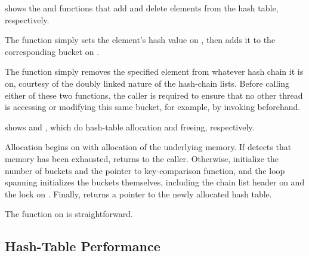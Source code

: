 shows the  and  functions
that add and delete elements from the hash table, respectively.

\begin{fcvref}
The  function simply sets the element's hash
value on , then adds it to the corresponding bucket on
.
\end{fcvref}
The  function simply removes the specified element
from whatever hash chain it is on, courtesy of the doubly linked
nature of the hash-chain lists.
Before calling either of these two functions, the caller is required to
ensure that no other thread is accessing
or modifying this same bucket, for example, by invoking
 beforehand.

\begin{listing}

\caption{Hash-Table Allocation and Free}
\label{lst:datastruct:Hash-Table Allocation and Free}
\end{listing}

shows  and ,
which do hash-table allocation and freeing, respectively.
\begin{fcvref}
Allocation begins on
 with allocation of the underlying memory.
If  detects that memory has been exhausted,
 returns
 to the caller.
Otherwise,  initialize
the number of buckets and the pointer to key-comparison function,
and the loop
spanning  initializes the buckets themselves,
including the chain list header on
 and the lock on .
Finally,  returns a pointer to the newly allocated hash table.
\end{fcvref}
\begin{fcvref}
The  function on
 is straightforward.
\end{fcvref}

\subsection{Hash-Table Performance}
\label{sec:datastruct:Hash-Table Performance}

